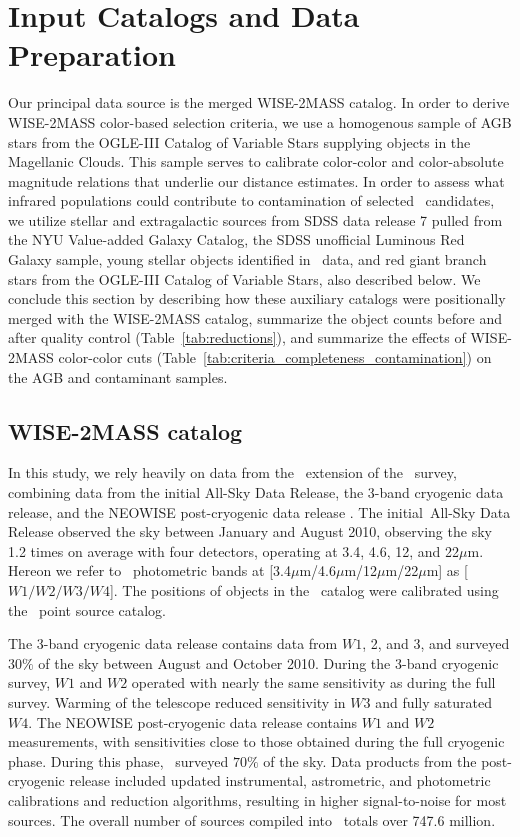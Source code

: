 \section{Input Catalogs and Data Preparation}
\label{sec:data}

Our principal data source is the merged WISE-2MASS catalog. In order to derive
WISE-2MASS color-based selection criteria, we use a homogenous sample of AGB stars from the OGLE-III Catalog of Variable Stars supplying objects in the Magellanic Clouds. This sample serves to calibrate color-color and color-absolute magnitude
relations that underlie our distance estimates. In order to assess what infrared populations
could contribute to contamination of selected \agb\ candidates, we utilize stellar and 
extragalactic sources from SDSS data release 7 pulled from the NYU Value-added Galaxy Catalog,
the SDSS unofficial Luminous Red Galaxy sample, young stellar objects identified in \wise\ data, and red giant branch stars from the OGLE-III Catalog of Variable Stars, also described below. 
We conclude this section by describing how these auxiliary catalogs were positionally merged
with the WISE-2MASS catalog, summarize the object counts before and after quality control (Table~\ref{tab:reductions}), and summarize the effects of WISE-2MASS color-color cuts (Table~\ref{tab:criteria_completeness_contamination}) on the AGB and contaminant samples. 

\subsection{WISE-2MASS catalog}
In this study, we rely heavily on data from the \allwise\, extension of the \wise\, survey, combining data from the initial All-Sky Data Release, the 3-band cryogenic data release, and the NEOWISE post-cryogenic data release \citep{2013wise.rept....1C}. The initial \wise\,All-Sky Data Release observed the sky between January and August 2010, observing the sky 1.2 times on average with four detectors, operating at 3.4, 4.6, 12, and 22$\mu$m. Hereon we refer to \allwise\, photometric bands at [3.4$\mu$m/4.6$\mu$m/12$\mu$m/22$\mu$m] as [$W1/W2/W3/W4$]. The positions of objects in the \wise\, catalog were calibrated using the \twomass\, point source catalog. 

The 3-band cryogenic data release contains data from $W1$, 2, and 3, and surveyed $30\%$ of the sky between August and October 2010. During the 3-band cryogenic survey, $W1$ and $W2$ operated with nearly the same sensitivity as during the full survey. Warming of the telescope reduced sensitivity in $W3$ and fully saturated $W4$. The NEOWISE post-cryogenic data release contains $W1$ and $W2$ measurements, with sensitivities close to those obtained during the full cryogenic phase. During this phase, \wise\, surveyed $70\%$ of the sky. Data products from the post-cryogenic release included updated instrumental, astrometric, and photometric calibrations and reduction algorithms, resulting in higher signal-to-noise for most sources. The overall number of sources compiled into \allwise\, totals over 747.6 million.

